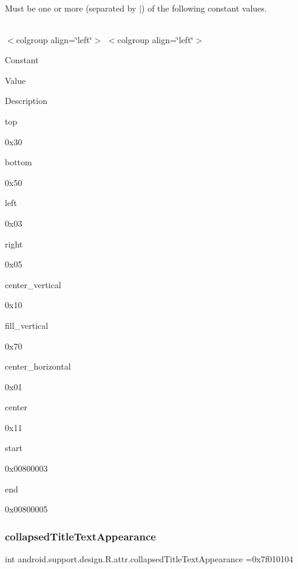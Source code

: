 Must be one or more (separated by \textquotesingle{}$\vert$\textquotesingle{}) of the following constant values.

\tabulinesep=1mm
\begin{longtabu} spread 0pt [c]{*{0}{|X[-1]}|}
\hline
\end{longtabu}
$<$colgroup align=\char`\"{}left\char`\"{}$>$ $<$colgroup align=\char`\"{}left\char`\"{}$>$ 

Constant

Value

Description 

{\ttfamily top}

0x30

{\ttfamily bottom}

0x50

{\ttfamily left}

0x03

{\ttfamily right}

0x05

{\ttfamily center\+\_\+vertical}

0x10

{\ttfamily fill\+\_\+vertical}

0x70

{\ttfamily center\+\_\+horizontal}

0x01

{\ttfamily center}

0x11

{\ttfamily start}

0x00800003

{\ttfamily end}

0x00800005\mbox{\label{classandroid_1_1support_1_1design_1_1R_1_1attr_a1ad0c01d0351c460d4cee0ba2b6ed855}} 
\subsubsection{\texorpdfstring{collapsed\+Title\+Text\+Appearance}{collapsedTitleTextAppearance}}
{\footnotesize\ttfamily int android.\+support.\+design.\+R.\+attr.\+collapsed\+Title\+Text\+Appearance =0x7f010104\hspace{0.3cm}{\ttfamily [static]}}

